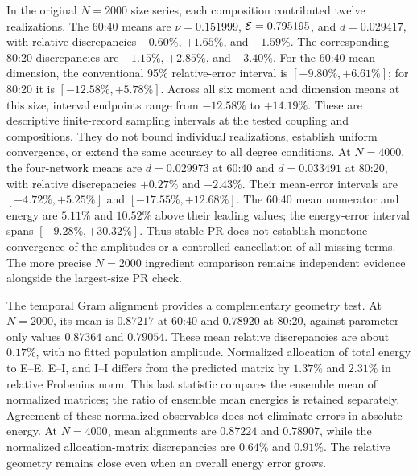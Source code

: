 In the original $N=2000$ size series, each composition contributed twelve realizations.
The 60:40 means are $\nu=0.151999$, $\mathcal E=0.795195$, and $d=0.029417$,
with relative discrepancies $-0.60\%$, $+1.65\%$, and $-1.59\%$.
The corresponding 80:20 discrepancies are $-1.15\%$, $+2.85\%$, and
$-3.40\%$. For the 60:40 mean dimension, the conventional 95\% relative-error
interval is $[-9.80\%,+6.61\%]$; for 80:20 it is
$[-12.58\%,+5.78\%]$. Across all six moment and dimension means at this
size, interval endpoints range from $-12.58\%$ to $+14.19\%$.
These are descriptive finite-record sampling intervals at the tested
coupling and compositions. They do not bound individual realizations,
establish uniform convergence, or extend the same accuracy to all degree
conditions.
At $N=4000$, the four-network means are $d=0.029973$ at 60:40 and
$d=0.033491$ at 80:20, with relative discrepancies $+0.27\%$ and
$-2.43\%$. Their mean-error intervals are
$[-4.72\%,+5.25\%]$ and $[-17.55\%,+12.68\%]$.
The 60:40 mean numerator and energy are $5.11\%$ and $10.52\%$ above
their leading values; the energy-error interval spans
$[-9.28\%,+30.32\%]$. Thus stable PR does not establish monotone
convergence of the amplitudes or a controlled cancellation of all missing
terms. The more precise $N=2000$ ingredient comparison remains independent
evidence alongside the largest-size PR check.



The temporal Gram alignment provides a complementary geometry test.
At $N=2000$, its mean is $0.87217$ at 60:40 and $0.78920$ at 80:20,
against parameter-only values $0.87364$ and $0.79054$. These mean
relative discrepancies are about $0.17\%$, with no fitted population amplitude.
Normalized allocation of total energy to E--E, E--I, and I--I differs from
the predicted matrix by $1.37\%$ and $2.31\%$ in relative Frobenius norm.
This last statistic compares the ensemble mean of normalized matrices;
the ratio of ensemble mean energies is retained separately. Agreement of
these normalized observables does not eliminate errors in absolute energy.
At $N=4000$, mean alignments are $0.87224$ and $0.78907$, while the
normalized allocation-matrix discrepancies are $0.64\%$ and $0.91\%$.
The relative geometry remains close even when an overall energy error grows.

